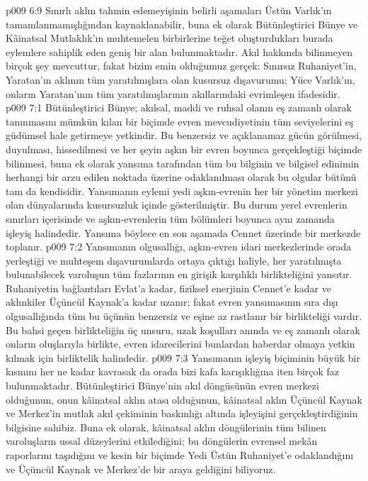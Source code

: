 \vs p009 6:9 Sınırlı aklın tahmin edemeyişinin belirli aşamaları Üstün Varlık’ın tamamlanmamışlığından kaynaklanabilir, buna ek olarak Bütünleştirici Bünye ve Kâinatsal Mutlaklık’ın muhtemelen birbirlerine teğet oluşturdukları burada eylemlere sahiplik eden geniş bir alan bulunmaktadır. Akıl hakkında bilinmeyen birçok şey mevcuttur, fakat bizim emin olduğumuz gerçek: Sınırsız Ruhaniyet’in, Yaratan’ın aklının tüm yaratılmışlara olan kusursuz dışavurumu; Yüce Varlık’ın, onların Yaratan’ının tüm yaratılmışlarının akıllarındaki evrimleşen ifadesidir.
\vs p009 7:1 Bütünleştirici Bünye; akılsal, maddi ve ruhsal olanın eş zamanlı olarak tanınmasını mümkün kılan bir biçimde evren mevcudiyetinin tüm seviyelerini eş güdümsel hale getirmeye yetkindir. Bu benzersiz ve açıklanamaz gücün görülmesi, duyulması, hissedilmesi ve her şeyin aşkın bir evren boyunca gerçekleştiği biçimde bilinmesi, buna ek olarak yansıma tarafından tüm bu bilginin ve bilgisel edinimin herhangi bir arzu edilen noktada üzerine odaklanılması olarak bu olgular bütünü  tam da kendisidir. Yansımanın eylemi yedi aşkın\hyp{}evrenin her bir yönetim merkezi olan dünyalarında kusursuzluk içinde gösterilmiştir. Bu durum yerel evrenlerin sınırları içerisinde ve aşkın\hyp{}evrenlerin tüm bölümleri boyunca aynı zamanda işleyiş halindedir. Yansıma böylece en son aşamada Cennet üzerinde bir merkezde toplanır.
\vs p009 7:2 Yansımanın olgusallığı, aşkın\hyp{}evren idari merkezlerinde orada yerleştiği ve muhteşem dışavurumlarda ortaya çıktığı haliyle, her yaratılmışta bulunabilecek varoluşun tüm fazlarının en girişik karşılıklı birlikteliğini yansıtır. Ruhaniyetin bağlantıları Evlat’a kadar, fiziksel enerjinin Cennet’e kadar ve aklınkiler Üçüncül Kaynak’a kadar uzanır; fakat evren yansımasının sıra dışı olgusallığında tüm bu üçünün benzersiz ve eşine az rastlanır bir birlikteliği vardır. Bu bahsi geçen birlikteliğin üç unsuru, uzak koşulları anında ve eş zamanlı olarak onların oluşlarıyla birlikte, evren idarecilerini bunlardan haberdar olmaya yetkin kılmak için birliktelik halindedir.
\vs p009 7:3 Yansımanın işleyiş biçiminin büyük bir kısmını her ne kadar kavrasak da orada bizi kafa karışıklığına iten birçok faz bulunmaktadır. Bütünleştirici Bünye’nin akıl döngüsünün evren merkezi olduğunun, onun kâinatsal aklın atası olduğunun, kâinatsal aklın Üçüncül Kaynak ve Merkez’in mutlak akıl çekiminin baskınlığı altında işleyişini gerçekleştirdiğinin bilgisine sahibiz. Buna ek olarak, kâinatsal aklın döngülerinin tüm bilinen varoluşların ussal düzeylerini etkilediğini; bu döngülerin evrensel mekân raporlarını taşıdığını ve kesin bir biçimde Yedi Üstün Ruhaniyet’e odaklandığını ve Üçüncül Kaynak ve Merkez’de bir araya geldiğini biliyoruz.
